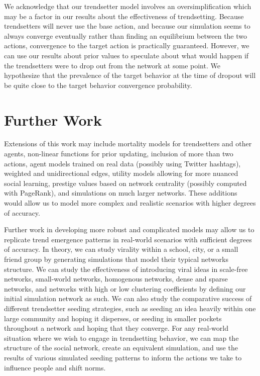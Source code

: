 \documentclass[11pt]{article}
\begin{document}
We acknowledge that our trendsetter model involves an oversimplification
which may be a factor in our results about the effectiveness of
trendsetting. Because trendsetters will never use the base action, and
because our simulation seems to always converge eventually rather than
finding an equilibrium between the two actions, convergence to the
target action is practically guaranteed. However, we can use our results
about prior values to speculate about what would happen if the
trendsetters were to drop out from the network at some point. We
hypothesize that the prevalence of the target behavior at the time of
dropout will be quite close to the target behavior convergence
probability.

\hypertarget{further-work}{%
\section{Further Work}\label{further-work}}

Extensions of this work may include mortality models for trendsetters
and other agents, non-linear functions for prior updating, inclusion of
more than two actions, agent models trained on real data (possibly using
Twitter hashtags), weighted and unidirectional edges, utility models
allowing for more nuanced social learning, prestige values based on
network centrality (possibly computed with PageRank), and simulations on
much larger networks. These additions would allow us to model more
complex and realistic scenarios with higher degrees of accuracy.

Further work in developing more robust and complicated models may allow
us to replicate trend emergence patterns in real-world scenarios with
sufficient degrees of accuracy. In theory, we can study virality within
a school, city, or a small friend group by generating simulations that
model their typical networks structure. We can study the effectiveness
of introducing viral ideas in scale-free networks, small-world networks,
homogenous networks, dense and sparse networks, and networks with high
or low clustering coefficients by defining our initial simulation
network as such. We can also study the comparative success of different
trendsetter seeding strategies, such as seeding an idea heavily within
one large community and hoping it disperses, or seeding in smaller
pockets throughout a network and hoping that they converge. For any
real-world situation where we wish to engage in trendsetting behavior,
we can map the structure of the social network, create an equivalent
simulation, and use the results of various simulated seeding patterns to
inform the actions we take to influence people and shift norms.
\end{document}
